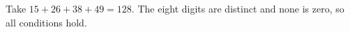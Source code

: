 Take $\boxed{15+26+38+49=128}$. The eight digits are distinct and none is zero, so all conditions hold.
